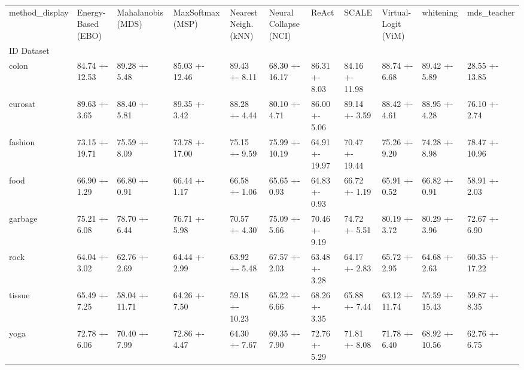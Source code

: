 \begin{tabular}{lllllllllll}
\toprule
method_display & Energy-Based (EBO) & Mahalanobis (MDS) & MaxSoftmax (MSP) & Nearest Neigh. (kNN) & Neural Collapse (NCI) & ReAct & SCALE & Virtual-Logit (ViM) & whitening & mds_teacher \\
ID Dataset &  &  &  &  &  &  &  &  &  &  \\
\midrule
colon & 84.74 +- 12.53 & 89.28 +- 5.48 & 85.03 +- 12.46 & 89.43 +- 8.11 & 68.30 +- 16.17 & 86.31 +- 8.03 & 84.16 +- 11.98 & 88.74 +- 6.68 & 89.42 +- 5.89 & 28.55 +- 13.85 \\
eurosat & 89.63 +- 3.65 & 88.40 +- 5.81 & 89.35 +- 3.42 & 88.28 +- 4.44 & 80.10 +- 4.71 & 86.00 +- 5.06 & 89.14 +- 3.59 & 88.42 +- 4.61 & 88.95 +- 4.28 & 76.10 +- 2.74 \\
fashion & 73.15 +- 19.71 & 75.59 +- 8.09 & 73.78 +- 17.00 & 75.15 +- 9.59 & 75.99 +- 10.19 & 64.91 +- 19.97 & 70.47 +- 19.44 & 75.26 +- 9.20 & 74.28 +- 8.98 & 78.47 +- 10.96 \\
food & 66.90 +- 1.29 & 66.80 +- 0.91 & 66.44 +- 1.17 & 66.58 +- 1.06 & 65.65 +- 0.93 & 64.83 +- 0.93 & 66.72 +- 1.19 & 65.91 +- 0.52 & 66.82 +- 0.91 & 58.91 +- 2.03 \\
garbage & 75.21 +- 6.08 & 78.70 +- 6.44 & 76.71 +- 5.98 & 70.57 +- 4.30 & 75.09 +- 5.66 & 70.46 +- 9.19 & 74.72 +- 5.51 & 80.19 +- 3.72 & 80.29 +- 3.96 & 72.67 +- 6.90 \\
rock & 64.04 +- 3.02 & 62.76 +- 2.69 & 64.44 +- 2.99 & 63.92 +- 5.48 & 67.57 +- 2.03 & 63.48 +- 3.28 & 64.17 +- 2.83 & 65.72 +- 2.95 & 64.68 +- 2.63 & 60.35 +- 17.22 \\
tissue & 65.49 +- 7.25 & 58.04 +- 11.71 & 64.26 +- 7.50 & 59.18 +- 10.23 & 65.22 +- 6.66 & 68.26 +- 3.35 & 65.88 +- 7.44 & 63.12 +- 11.74 & 55.59 +- 15.43 & 59.87 +- 8.35 \\
yoga & 72.78 +- 6.06 & 70.40 +- 7.99 & 72.86 +- 4.47 & 64.30 +- 7.67 & 69.35 +- 7.90 & 72.76 +- 5.29 & 71.81 +- 8.08 & 71.78 +- 6.40 & 68.92 +- 10.56 & 62.76 +- 6.75 \\
\bottomrule
\end{tabular}
